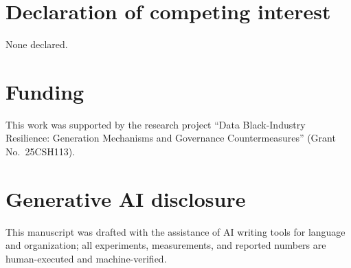 \section*{Declaration of competing interest}
None declared.

\section*{Funding}
This work was supported by the research project ``Data Black-Industry
Resilience: Generation Mechanisms and Governance Countermeasures''
(Grant No.\ 25CSH113).

\section*{Generative AI disclosure}
This manuscript was drafted with the assistance of AI writing tools for language
and organization; all experiments, measurements, and reported numbers are
human-executed and machine-verified.
